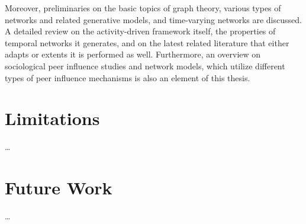 Moreover, preliminaries on the basic topics of graph theory, various types of networks and related generative models, and time-varying networks are discussed.
A detailed review on the activity-driven framework itself, the properties of temporal networks it generates, and on the latest related literature that either adapts or extents it is performed as well.
Furthermore, an overview on sociological peer influence studies and network models, which utilize different types of peer influence mechanisms is also an element of this thesis.




\section{Limitations}
\label{sec:limitations}

\ldots




\section{Future Work}
\label{sec:future-work}

\ldots
